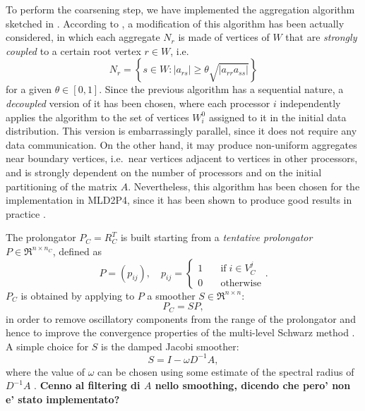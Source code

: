 To perform the coarsening step, we have implemented the aggregation algorithm sketched
in \cite{apnum_07}. According to \cite{brezina_vanek}, a modification of this algorithm
has been actually considered,
in which each aggregate $N_r$ is made of vertices of $W$ that are \emph{strongly coupled}
to a certain root vertex $r \in W$, i.e.\
\[  N_r = \left\{s \in W: |a_{rs}| \geq \theta \sqrt{|a_{rr}a_{ss}|} \right\} \]
for a given $\theta \in [0,1]$.
Since the previous algorithm has a sequential nature, a \emph{decoupled} version of
it has been chosen, where each processor $i$ independently applies the algorithm to
the set of vertices $W_i^0$ assigned to it in the initial data distribution. This
version is embarrassingly parallel, since it does not require any data communication.
On the other hand, it may produce non-uniform aggregates near boundary vertices,
i.e.\ near vertices adjacent to vertices in other processors, and is strongly
dependent on the number of processors and on the initial partitioning of the matrix $A$.
Nevertheless, this algorithm has been chosen for the implementation in MLD2P4,
since it has been shown to produce good results in practice \cite{Tuminaro_Tong_00}.

The prolongator $P_C=R_C^T$ is built starting from a \emph{tentative prolongator}
$P \in \Re^{n \times n_C}$, defined as
\begin{equation} 
P=(p_{ij}), \quad  p_{ij}= 
\left\{ \begin{array}{ll}
1 & \quad \mbox{if} \; i \in V^j_C \\
0 & \quad \mbox{otherwise}
\end{array} \right. .
\label{eq:tent_prol}
\end{equation}
$P_C$ is obtained by
applying to $P$ a smoother $S \in \Re^{n \times n}$:
\begin{equation}
P_C = S P,
\label{eq:smoothed_prol}
\end{equation}
in order to remove oscillatory components from the range of the prolongator
and hence to improve the convergence properties of the multi-level
Schwarz method \cite{Brezina_Vanek_,StubenGMD69_99}.
A simple choice for $S$ is the damped Jacobi smoother:
\begin{equation}
S = I - \omega D^{-1} A , 
\label{eq:jac_smoother}
\end{equation}
where the value of $\omega$ can be chosen
using some estimate of the spectral radius of $D^{-1}A$ \cite{Brezina_Vanek}.
\textbf{Cenno al filtering di $A$ nello smoothing, dicendo che pero' non e' stato
implementato?}

